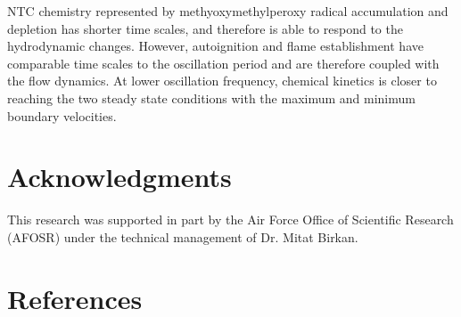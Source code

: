 \documentclass[review,3p,times]{elsarticle}
\begin{document}
\textcolor{Rev1}{NTC chemistry represented by methyoxymethylperoxy radical accumulation and depletion has shorter time scales, and therefore is able to respond to the hydrodynamic changes.  However, autoignition and flame establishment have comparable time scales to the oscillation period and are therefore coupled with the flow dynamics.  At lower oscillation frequency, chemical kinetics is closer to reaching the two steady state conditions with the maximum and minimum boundary velocities.}

\section*{Acknowledgments}
This research was supported in part by the Air Force Office of Scientific Research (AFOSR) under the technical management of Dr. Mitat Birkan.


\section*{References}



\renewcommand{\thefigure}{\arabic{figure}}
\renewcommand{\thetable}{\arabic{table}}

\clearpage
\end{document}
